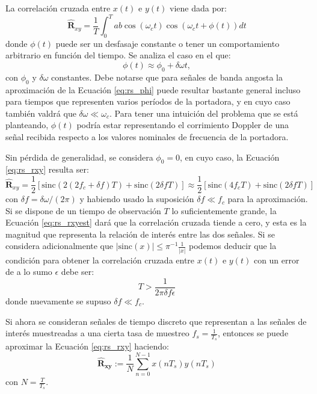 La correlación cruzada entre $x(t)$ e $y(t)$ viene dada por:
\begin{equation}
    \mathbf{\hat{R}}_{xy}=\frac{1}{T} \int_0 ^T ab \cos(\omega_c t) \cos(\omega_c t + \phi(t))dt
    \label{eq:rs_rxy}
\end{equation}
donde $\phi(t)$ puede ser un desfasaje constante o tener un comportamiento arbitrario en función del tiempo. Se analiza el caso en el que:
\begin{equation}
    \phi(t)\approx\phi_0 + \delta \omega t,
    \label{eq:rs_phi}
\end{equation}
con $\phi_0$ y $\delta \omega$ constantes. Debe notarse que para señales de banda angosta la aproximación de la Ecuación \ref{eq:rs_phi} puede resultar bastante general incluso para tiempos que representen varios períodos de la portadora, y en cuyo caso también valdrá que $\delta \omega \ll \omega_c$. Para tener una intuición del problema que se está planteando, $\phi(t)$ podría estar representando el corrimiento Doppler de una señal recibida respecto a los valores nominales de frecuencia de la portadora.

Sin pérdida de generalidad, se considera $\phi_0=0$, en cuyo caso, la Ecuación \ref{eq:rs_rxy} resulta ser:
\begin{equation}
    \mathbf{\hat{R}}_{xy}= \frac{1}{2} \left[ \mathrm{sinc}(2(2f_c+\delta f)T) + \mathrm{sinc}(2\delta f T) \right] \approx \frac{1}{2} \left[ \mathrm{sinc}(4f_c T) +\mathrm{sinc}(2\delta fT) \right]
    \label{eq:rs_rxyest}
\end{equation}
con $\delta f=\delta \omega /(2\pi)$ y habiendo usado la suposición $\delta f\ll f_c$ para la aproximación. Si se dispone de un tiempo de observación $T$ lo suficientemente grande, la Ecuación \ref{eq:rs_rxyest} dará que la correlación cruzada tiende a cero, y esta es la magnitud que representa la relación de interés entre las dos señales.  Si se considera adicionalmente que $|\mathrm{sinc}(x)|\leq \pi^{-1} \frac{1}{|x|}$ podemos deducir que la condición para obtener la correlación cruzada entre $x(t)$ e $y(t)$ con un error de a lo sumo $\epsilon$ debe ser:
\begin{equation}
    T>\frac{1}{2\pi \delta f \epsilon}
    \label{eq:rs_t_geq}
\end{equation}
donde nuevamente se supuso $\delta f \ll f_c$.

Si ahora se consideran señales de tiempo discreto que representan a las señales de interés muestreadas a una cierta tasa de muestreo $f_s = \frac{1}{T_s}$, entonces se puede aproximar la Ecuación \ref{eq:rs_rxy} haciendo:
\begin{equation}
    \mathbf{\hat{R}_{xy}}:=\frac{1}{N} \sum_{n=0}^{N-1} x(nT_s)y(nT_s)
    \label{eq:rs_rxydisc}
\end{equation}
con $N= \frac{T}{T_s}$.

